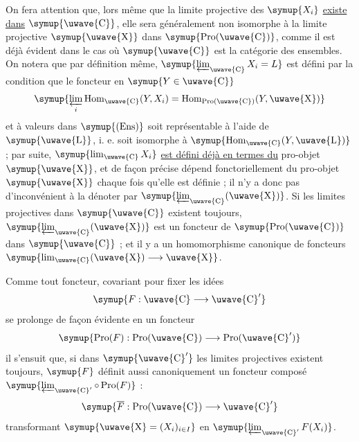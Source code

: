 On fera attention que, lors même que la limite projective des $\symup{X_i}$ \uline{existe dans} $\symup{\text{\uwave{C}}}$, elle
sera généralement non isomorphe à la limite projective $\symup{\text{\uwave{X}}}$ dans
$\symup{\operatorname{Pro}(\text{\uwave{C}})}$, comme il est déjà évident dans le cas où
$\symup{\text{\uwave{C}}}$ est la catégorie des ensembles. On notera que par définition
même, $\symup{\varprojlim_{\text{\uwave{C}}}X_i=L}$ est défini par la condition que le
foncteur en $\symup{Y\in\text{\uwave{C}}}$
\[
  \symup{\varprojlim\limits_i\operatorname{Hom}_{\text{\uwave{C}}}(Y,X_i)
  =\operatorname{Hom}_{\operatorname{Pro}(\text{\uwave{C}})}(Y,\text{\uwave{X}})}
\]
et à valeurs dans $\symup{(\operatorname{Ens})}$ soit représentable à l'aide de $\symup{\text{\uwave{L}}}$, i. e. soit isomorphe à $\symup{\operatorname{Hom}_{\text{\uwave{C}}}(Y,\text{\uwave{L}})}$ ; par suite,
$\symup{\lim_{\text{\uwave{C}}}X_i}$ \uline{est défini déjà en termes du} pro-objet
$\symup{\text{\uwave{X}}}$, et de façon précise dépend fonctoriellement du pro-objet
$\symup{\text{\uwave{X}}}$ chaque fois qu'elle est définie ; il n'y a donc pas
d'inconvénient à la dénoter par $\symup{\varprojlim_{\text{\uwave{C}}}(\text{\uwave{X}})}$. Si
les limites projectives dans $\symup{\text{\uwave{C}}}$ existent toujours,
$\symup{\varprojlim_{\text{\uwave{C}}}(\text{\uwave{X}})}$ est un foncteur de
$\symup{\operatorname{Pro}(\text{\uwave{C}})}$ dans $\symup{\text{\uwave{C}}}$ ; et il y a un
homomorphisme canonique de foncteurs
$\symup{\lim_{\text{\uwave{C}}}(\text{\uwave{X}})\longrightarrow\text{\uwave{X}}}$.

Comme tout foncteur, covariant pour fixer les idées
\[
  \symup{F:\text{\uwave{C}}\longrightarrow\text{\uwave{C}}'}
\]
se prolonge de façon évidente en un foncteur
\[
  \symup{\operatorname{Pro}(F):\operatorname{Pro}(\text{\uwave{C}})
  \longrightarrow\operatorname{Pro}(\text{\uwave{C}}')}
\]
il s'ensuit que, si dans $\symup{\text{\uwave{C}}'}$ les limites projectives existent
toujours, $\symup{F}$ définit aussi canoniquement un foncteur composé $\symup{\varprojlim_{\text{\uwave{C}}'}\circ\operatorname{Pro}(F)}$ :
\[
  \symup{\overline F:\operatorname{Pro}(\text{\uwave{C}})\longrightarrow\text{\uwave{C}}'}
\]
transformant $\symup{\text{\uwave{X}}=(X_i)_{i\in I}}$ en
$\symup{\varprojlim_{\text{\uwave{C}}'}F(X_i)}$.

